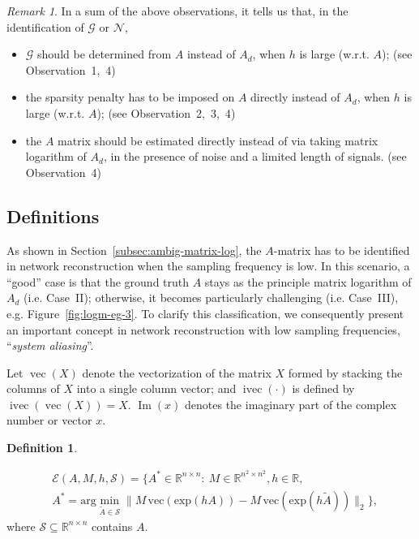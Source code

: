 \documentclass[letterpaper,10pt,journal,final]{IEEEtran}
\theoremstyle{definition}
\newtheorem{definition}[theorem]{Definition}
\theoremstyle{remark}
\newtheorem{remark}{Remark}
\newcommand{\im}{\operatorname{Im}}
\newcommand{\kvec}{\operatorname{vec}}
\newcommand{\ikvec}{\operatorname{ivec}}
\begin{document}
\begin{remark}
  In a sum of the above observations, it tells us that, in the identification of $\mathcal{G}$ or $\mathcal{N}$,
  \begin{itemize}
  \item  $\mathcal{G}$ should be determined from $A$ instead of $A_d$, when $h$ is
    large (w.r.t. $A$); (see {Observation~1,~4})
  \item  the sparsity penalty has to be imposed on $A$ directly instead of $A_d$,
    when $h$ is large (w.r.t. $A$); (see {Observation~2,~3,~4})
  \item  the $A$ matrix should be estimated directly instead of via taking matrix
    logarithm of $A_d$, in the presence of noise and a limited length of
    signals. (see {Observation~4})
  \end{itemize}
\end{remark}


\subsection{Definitions}
\label{subsec:definitions}

As shown in Section~\ref{subsec:ambig-matrix-log}, the $A$-matrix has to be
identified in network reconstruction when the sampling frequency is low. In this
scenario, a ``good'' case is that the ground truth $A$ stays as the principle
matrix logarithm of $A_d$ (i.e. {Case~II}); otherwise, it becomes particularly
challenging (i.e. {Case~III}), e.g. Figure~\ref{fig:logm-eg-3}.  To clarify this
classification, we consequently present an important concept in network
reconstruction with low sampling frequencies, ``\emph{system aliasing}''.

Let $\kvec(X)$ denote the vectorization of the matrix $X$ formed by stacking the
columns of $X$ into a single column vector; and $\ikvec(\cdot)$ is defined by
$\ikvec(\kvec(X)) = X$. $\im(x)$ denotes the imaginary part of the complex
number or vector $x$.
\begin{definition}
  \label{def:E-for-sys-alias}

  \begin{align*}
    &\mathscr{E}(A, M, h, \mathscr{S})=
      \Big\{A^* \in \mathbb{R}^{n \times n}:\ M \in \mathbb{R}^{n^2 \times n^2}, h \in \mathbb{R}, \\
    \nonumber
    & A^*  =  \mathrm{arg}\min_{\tilde{A} \in \mathscr{S} }\|M\,\mathrm{vec}(\mathrm{exp}(hA))
      - M\,\mathrm{vec}(\mathrm{exp}(h\tilde{A}))\|_{2} \Big\},
  \end{align*}
  where $\mathscr{S} \subseteq \mathbb{R}^{n \times n}$ contains $A$.
\end{definition}
\end{document}
